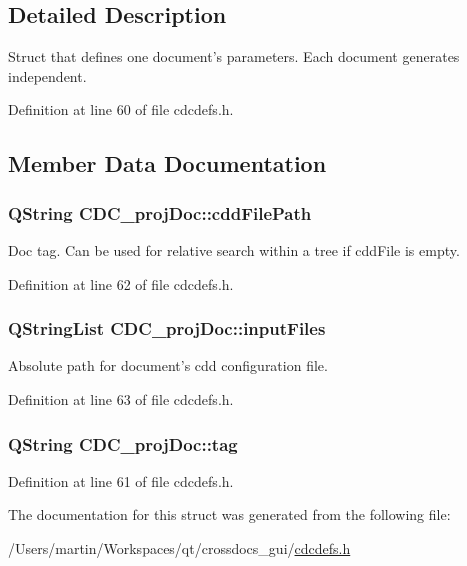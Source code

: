 \subsection{Detailed Description}
Struct that defines one document's parameters. Each document generates independent. 

Definition at line 60 of file cdcdefs.\+h.



\subsection{Member Data Documentation}
\hypertarget{struct_c_d_c__proj_doc_a4f3700af6b69bfc6188c414ff91be1a5}{
\subsubsection[{cdd\+File\+Path}]{\setlength{\rightskip}{0pt plus 5cm}Q\+String C\+D\+C\+\_\+proj\+Doc\+::cdd\+File\+Path}}\label{struct_c_d_c__proj_doc_a4f3700af6b69bfc6188c414ff91be1a5}


Doc tag. Can be used for relative search within a tree if cdd\+File is empty. 



Definition at line 62 of file cdcdefs.\+h.

\hypertarget{struct_c_d_c__proj_doc_a0edefa609111f55b1a8bbef4493ef3f3}{
\subsubsection[{input\+Files}]{\setlength{\rightskip}{0pt plus 5cm}Q\+String\+List C\+D\+C\+\_\+proj\+Doc\+::input\+Files}}\label{struct_c_d_c__proj_doc_a0edefa609111f55b1a8bbef4493ef3f3}


Absolute path for document's cdd configuration file. 



Definition at line 63 of file cdcdefs.\+h.

\hypertarget{struct_c_d_c__proj_doc_afcd597894a882dfe594315a3930bc492}{
\subsubsection[{tag}]{\setlength{\rightskip}{0pt plus 5cm}Q\+String C\+D\+C\+\_\+proj\+Doc\+::tag}}\label{struct_c_d_c__proj_doc_afcd597894a882dfe594315a3930bc492}


Definition at line 61 of file cdcdefs.\+h.



The documentation for this struct was generated from the following file\+:\begin{DoxyCompactItemize}
\item 
/\+Users/martin/\+Workspaces/qt/crossdocs\+\_\+gui/\hyperlink{cdcdefs_8h}{cdcdefs.\+h}\end{DoxyCompactItemize}
